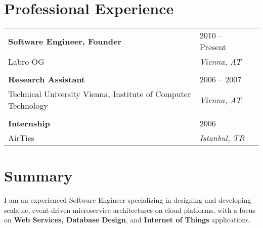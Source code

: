 \documentclass[11pt,a4paper,oneside]{article}
\begin{document}

\section{\bf Professional Experience}
\begin{longtable}{  L{0.70\textwidth}  R{0.25\textwidth}  R{0.05\textwidth }} 
\textbf{Software Engineer, Founder} & 2010 -- Present \\
Labro OG & \textit{Vienna, AT} \\
\vspace{1pt}\\
\textbf{Research Assistant} & 2006 -- 2007\\
Technical University Vienna, Institute of Computer Technology & \textit{Vienna, AT} \\
\vspace{1pt}\\
\textbf{Internship} & 2006\\
AirTies & \textit{Istanbul, TR} \\
\end{longtable}

\section{\bf Summary}
\begin{adjustwidth}{1.5em}{2em}
I am an experienced Software Engineer specializing in designing and developing scalable, event-driven microservice architectures on cloud platforms, with a focus on  \textbf{Web Services, Database Design}, and  \textbf{Internet of Things} applications. 
\end{adjustwidth}
\end{document}
